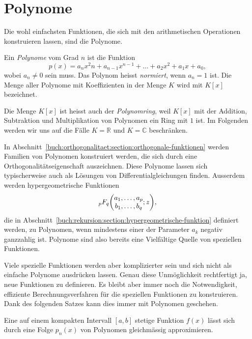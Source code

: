 %
%
%
\section{Polynome
\label{buch:potenzen:section:polynome}}
Die wohl einfachsten Funktionen, die sich mit den arithmetischen
Operationen konstruieren lassen, sind die Polynome.

\begin{definition}
%
Ein {\em Polynome} vom Grad $n$ ist die Funktion
\[
p(x) = a_nx^2n + a_{n-1}x^{n-1} + \dots + a_2x^2 + a_1x + a_0,
\]
wobei $a_n\ne 0$ sein muss.
Das Polynom heisst {\em normiert}, wenn $a_n=1$ ist.
%
Die Menge aller Polynome mit Koeffizienten in der Menge $K$ wird mit
$K[x]$ bezeichnet.
\end{definition}

Die Menge $K[x]$ ist heisst auch der {\em Polynomring}, weil $K[x]$
mit der Addition, Subtraktion und Multiplikation von Polynomen ein
Ring mit $1$ ist.
Im Folgenden werden wir uns auf die Fälle $K=\mathbb{R}$ und $K=\mathbb{C}$
beschränken.

In Abschnitt~\ref{buch:orthogonalitaet:section:orthogonale-funktionen} werden
Familien von Polynomen konstruiert werden, die sich durch eine
Orthogonalitätseigenschaft auszeichnen.
Diese Polynome lassen sich typischerweise auch als Lösungen von
Differentialgleichungen finden.
Ausserdem werden hypergeometrische Funktionen
\[
\mathstrut_pF_q\biggl(\begin{matrix}a_1,\dots,a_p\\b_1,\dots,b_q\end{matrix};z\biggr),
\] die in
Abschnitt~\ref{buch:rekursion:section:hypergeometrische-funktion}
definiert werden, zu Polynomen, wenn mindestens einer der
Parameter $a_k$ negativ ganzzahlig ist.
Polynome sind also bereits eine Vielfältige Quelle von speziellen
Funktionen.

Viele spezielle Funktionen werden aber komplizierter sein und
sich nicht als einfache Polynome ausdrücken lassen.
Genau diese Unmöglichkeit rechtfertigt ja, neue Funktionen
zu definieren.
Es bleibt aber immer noch die Notwendigkeit, effiziente 
Berechnungsverfahren für die speziellen Funktionen zu konstruieren.
Dank des folgenden Satzes kann dies immer mit Polynomen geschehen.

\begin{satz}[Weierstrass]
\label{buch:potenzen:satz:weierstrass}
Eine auf einem kompakten Intervall $[a,b]$ stetige Funktion $f(x)$
lässt sich durch eine Folge $p_n(x)$ von Polynomen gleichmässig
approximieren.
\end{satz}

